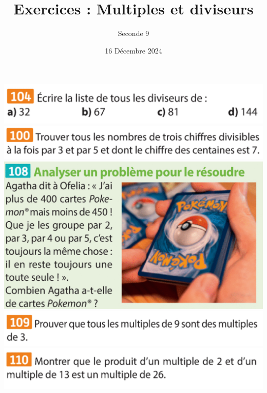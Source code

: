 \documentclass{article}
\title{Exercices : Multiples et diviseurs}
\author{Seconde 9}
\date{16 Décembre 2024}
\begin{document}
\maketitle
\begin{center}
\includegraphics[width=\textwidth]{Exercice_3.png}
\includegraphics[width=\textwidth]{Exercice_4.png}
\includegraphics[width=\textwidth]{Exercice_5.png}
\includegraphics[width=\textwidth]{Exercice_1.png}
\includegraphics[width=\textwidth]{Exercice_2.png}
\end{center}
\end{document}
